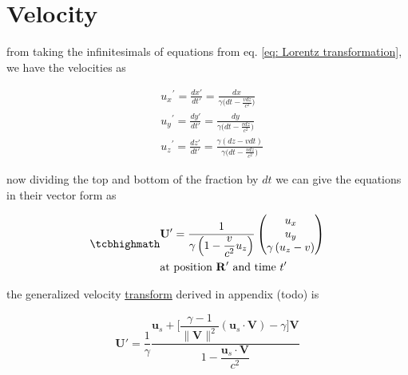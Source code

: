 \section{Velocity}

from taking the infinitesimals of equations from eq.
\eqref{eq: Lorentz transformation}, we have the velocities as

\begin{equation}
	\begin{aligned}
		 & {{u}_{x}}^{'} = \frac{dx{'}}{dt{'}}=\frac{dx}{{\gamma} \bigg(dt-\frac{vdz}{c^2}\bigg) }                  \\
		 & {{u}_{y}}^{'} = \frac{dy{'}}{dt{'}}=\frac{dy}{{\gamma} \bigg(dt-\frac{vdz}{c^2}\bigg) }                  \\
		 & {{u}_{z}}^{'} = \frac{dz{'}}{dt{'}} = \frac{{\gamma} (dz-vdt)}{{\gamma} \bigg(dt-\frac{vdz}{c^2}\bigg) }
	\end{aligned}
\end{equation}

now dividing the top and bottom of the fraction by $dt$ we can give the equations in their vector form as

\begin{equation}
	\label{eq: velocity transform}
	\mhl{
		\begin{aligned}
			 & \mathbf{U}{'} = \dfrac{1}{{\gamma}\left(1- \dfrac{v}{c^2} {{u}_{z}}\right) }
			\begin{pmatrix}
				{{u}_{x}}                             \\
				{{u}_{y}}                             \\
				{\gamma} \left( {{u}_{z}} - v \right) \\
			\end{pmatrix}
			\\
			 & \text{at position $\mathbf{R}{'}$ and time $t{'}$ }
		\end{aligned}
	}
\end{equation}

the generalized velocity \hyperlink{def-transform}{transform} derived in appendix (todo) is

\begin{equation}
	\mathbf{U}{'} = \dfrac{1}{{\gamma}} \dfrac{\mathbf{u}_s + \Big[\dfrac{{\gamma}-1}{\|\mathbf{V}\|^2}(\mathbf{u}_s\cdot \mathbf{V})- {\gamma} \Big] \mathbf{V}}{1 - \dfrac{\mathbf{u}_s\cdot\mathbf{V}}{c^2}}
\end{equation}

